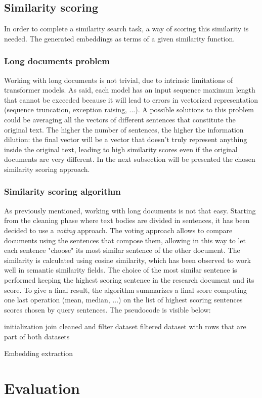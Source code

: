 \documentclass[\main/main.tex]{subfiles}
\begin{document}
\subsection{Similarity scoring}
In order to complete a similarity search task, a way of scoring this similarity is needed. The generated embeddings as terms of a given similarity function. 
\subsubsection{Long documents problem}
Working with long documents is not trivial, due to intrinsic limitations of transformer models. As said, each model has an input sequence maximum length that cannot be exceeded because it will lead to errors in vectorized representation (sequence truncation, exception raising, ...). A possible solutions to this problem could be averaging all the vectors of different sentences that constitute the original text. The higher the number of sentences, the higher the information dilution: the final vector will be a vector that doesn't truly represent anything inside the original text, leading to high similarity scores even if the original documents are very different. In the next subsection will be presented the chosen similarity scoring approach.
\subsubsection{Similarity scoring algorithm}
As previously mentioned, working with long documents is not that easy. Starting from the cleaning phase where text bodies are divided in sentences, it has been decided to use a \textit{voting} approach. The voting approach allows to compare documents using the sentences that compose them, allowing in this way to let each sentence "choose" its most similar sentence of the other document. The similarity is calculated using cosine similarity, which has been observed to work well in semantic similarity fields. The choice of the most similar sentence is performed keeping the highest scoring sentence in the research document and its score. To give a final result, the algorithm summarizes a final score computing one last operation (mean, median, ...) on the list of highest scoring sentences scores chosen by query sentences. The pseudocode is visible below:
\begin{center}
    \begin{algorithm}[H]
     initialization
     join cleaned and filter dataset
     \Return filtered dataset with rows that are part of both datasets
     \caption{Embedding extraction}
    \end{algorithm}
\end{center}


\section{Evaluation}
\todo[inline]{write evaluation explanation]}
\end{document}
